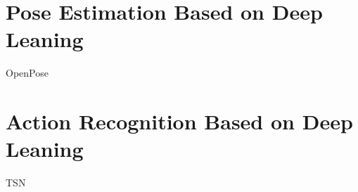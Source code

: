 \label{sec:related}

\section{Pose Estimation Based on Deep Leaning}

OpenPose \cite{cao2018openpose}

\section{Action Recognition Based on Deep Leaning}

TSN \cite{wang2016temporal}

\EndChapter
